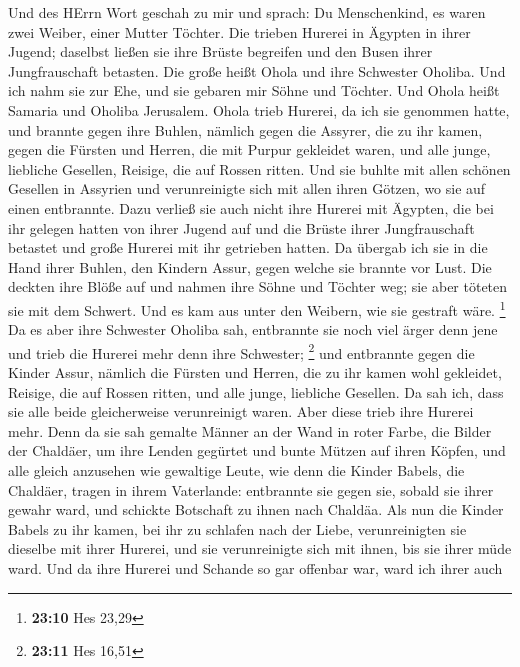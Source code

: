  Und des HErrn Wort geschah zu mir und sprach:
 Du Menschenkind, es waren zwei Weiber, einer Mutter
Töchter.  Die trieben Hurerei in Ägypten in ihrer Jugend;
daselbst ließen sie ihre Brüste begreifen und den Busen ihrer
Jungfrauschaft betasten.  Die große heißt Ohola und ihre
Schwester Oholiba. Und ich nahm sie zur Ehe, und sie gebaren mir Söhne
und Töchter. Und Ohola heißt Samaria und Oholiba Jerusalem.
 Ohola trieb Hurerei, da ich sie genommen hatte, und
brannte gegen ihre Buhlen, nämlich gegen die Assyrer, die zu ihr kamen,
 gegen die Fürsten und Herren, die mit Purpur gekleidet
waren, und alle junge, liebliche Gesellen, Reisige, die auf Rossen
ritten.  Und sie buhlte mit allen schönen Gesellen in
Assyrien und verunreinigte sich mit allen ihren Götzen, wo sie auf einen
entbrannte.  Dazu verließ sie auch nicht ihre Hurerei mit
Ägypten, die bei ihr gelegen hatten von ihrer Jugend auf und die Brüste
ihrer Jungfrauschaft betastet und große Hurerei mit ihr getrieben
hatten.  Da übergab ich sie in die Hand ihrer Buhlen, den
Kindern Assur, gegen welche sie brannte vor Lust.  Die
deckten ihre Blöße auf und nahmen ihre Söhne und Töchter weg; sie aber
töteten sie mit dem Schwert. Und es kam aus unter den Weibern, wie sie
gestraft wäre. \footnote{\textbf{23:10} Hes 23,29}  Da es
aber ihre Schwester Oholiba sah, entbrannte sie noch viel ärger denn
jene und trieb die Hurerei mehr denn ihre Schwester; \footnote{\textbf{23:11}
  Hes 16,51}  und entbrannte gegen die Kinder Assur,
nämlich die Fürsten und Herren, die zu ihr kamen wohl gekleidet,
Reisige, die auf Rossen ritten, und alle junge, liebliche Gesellen.
 Da sah ich, dass sie alle beide gleicherweise
verunreinigt waren.  Aber diese trieb ihre Hurerei mehr.
Denn da sie sah gemalte Männer an der Wand in roter Farbe, die Bilder
der Chaldäer,  um ihre Lenden gegürtet und bunte Mützen
auf ihren Köpfen, und alle gleich anzusehen wie gewaltige Leute, wie
denn die Kinder Babels, die Chaldäer, tragen in ihrem Vaterlande:
 entbrannte sie gegen sie, sobald sie ihrer gewahr ward,
und schickte Botschaft zu ihnen nach Chaldäa.  Als nun
die Kinder Babels zu ihr kamen, bei ihr zu schlafen nach der Liebe,
verunreinigten sie dieselbe mit ihrer Hurerei, und sie verunreinigte
sich mit ihnen, bis sie ihrer müde ward.  Und da ihre
Hurerei und Schande so gar offenbar war, ward ich ihrer auch
